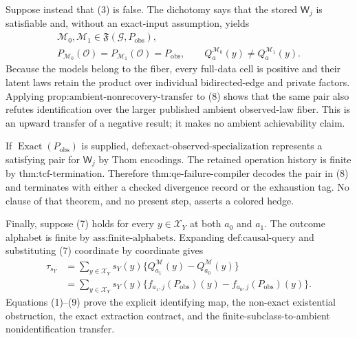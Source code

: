 Suppose instead that (3) is false. The dichotomy says that the stored \(\mathsf W_j\) is satisfiable and, without an exact-input assumption, yields
\[
\begin{gathered}
\mathcal M_0,\mathcal M_1\in\mathfrak F(\mathcal G,P_{\mathrm{obs}}),\\
P_{\mathcal M_0}(\mathcal O)=P_{\mathcal M_1}(\mathcal O)=P_{\mathrm{obs}},
\qquad
Q_a^{\mathcal M_0}(y)\neq Q_a^{\mathcal M_1}(y).
\end{gathered}
\tag{8}
\]
Because the models belong to the fiber, every full-data cell is positive and their latent laws retain the product over individual bidirected-edge and private factors. Applying \(\text{prop:ambient-nonrecovery-transfer}\) to (8) shows that the same pair also refutes identification over the larger published ambient observed-law fiber. This is an upward transfer of a negative result; it makes no ambient achievability claim.

If \(\operatorname{Exact}(P_{\mathrm{obs}})\) is supplied, \(\text{def:exact-observed-specialization}\) represents a satisfying pair for \(\mathsf W_j\) by Thom encodings. The retained operation history is finite by \(\text{thm:tcf-termination}\). Therefore \(\text{thm:qe-failure-compiler}\) decodes the pair in (8) and terminates with either a checked divergence record or the exhaustion tag. No clause of that theorem, and no present step, asserts a colored hedge.

Finally, suppose (7) holds for every \(y\in\mathcal X_Y\) at both \(a_0\) and \(a_1\). The outcome alphabet is finite by \(\text{ass:finite-alphabets}\). Expanding \(\text{def:causal-query}\) and substituting (7) coordinate by coordinate gives
\[
\begin{aligned}
\tau_{s_Y}
&=\sum_{y\in\mathcal X_Y}s_Y(y)
\{Q_{a_1}^{\mathcal M}(y)-Q_{a_0}^{\mathcal M}(y)\}\\
&=\sum_{y\in\mathcal X_Y}s_Y(y)
\{f_{a_1,j}(P_{\mathrm{obs}})(y)
-f_{a_0,j}(P_{\mathrm{obs}})(y)\}.
\end{aligned}
\tag{9}
\]
Equations (1)--(9) prove the explicit identifying map, the non-exact existential obstruction, the exact extraction contract, and the finite-subclass-to-ambient nonidentification transfer.